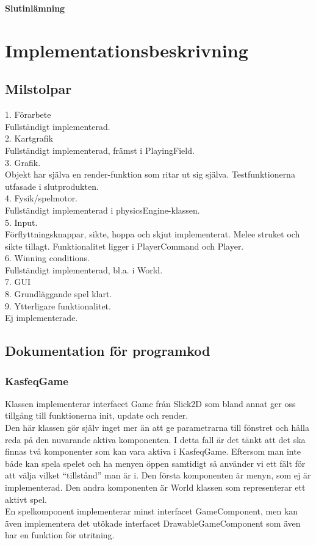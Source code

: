 \begin{center}
  \textbf{\Huge Slutinlämning}\\[1cm]
\end{center}
\section{Implementationsbeskrivning}
\subsection{Milstolpar}
1. Förarbete\\
Fullständigt implementerad.\\
2. Kartgrafik\\
Fullständigt implementerad, främst i PlayingField.\\
3. Grafik.\\
Objekt har själva en render-funktion som ritar ut sig själva. Testfunktionerna utfasade i slutprodukten.\\
4. Fysik/spelmotor.\\
Fullständigt implementerad i physicsEngine-klassen.\\
5. Input.\\
Förflyttningsknappar, sikte, hoppa och skjut implementerat. Melee struket och sikte tillagt. Funktionalitet ligger i PlayerCommand och Player.\\
6. Winning conditions.\\
Fullständigt implementerad, bl.a. i World.\\
7. GUI\\
8. Grundläggande spel klart.\\
9. Ytterligare funktionalitet.\\
Ej implementerade.\\
\subsection{Dokumentation för programkod}
\subsubsection{KasfeqGame}
Klassen implementerar interfacet Game från Slick2D som bland annat ger oss tillgång till funktionerna init, update och render.\\
Den här klassen gör själv inget mer än att ge parametrarna till fönstret och hålla reda på den nuvarande aktiva komponenten. I detta fall är det tänkt att det ska finnas två komponenter som kan vara aktiva i KasfeqGame. Eftersom man inte både kan spela spelet och ha menyen öppen samtidigt så använder vi ett fält för att välja vilket ``tillstånd'' man är i. Den första komponenten är menyn, som ej är implementerad. Den andra komponenten är World klassen som representerar ett aktivt spel.\\
En spelkomponent implementerar minst interfacet GameComponent, men kan även implementera det utökade interfacet DrawableGameComponent som även har en funktion för utritning.\\
